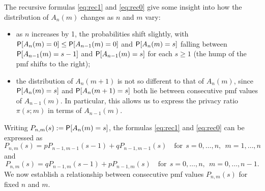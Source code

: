 \documentclass[11pt,draft]{article}
\begin{document}
The recursive formulas \eqref{eq:rec1} and \eqref{eq:rec0} give some insight into how the distribution of $A_n(m)$ changes as $n$ and $m$ vary:
\begin{itemize}
\item  as $n$ increases by 1, the probabilities shift slightly, with $\P[A_n(m) = 0] \leq \P[A_{n-1}(m) = 0]$ and
$\P[A_n(m) = s]$ falling between $\P[A_{n-1}(m) = s-1]$ and $\P[A_{n-1}(m) = s]$ for each $s\geq 1$ (\ie the hump of the pmf shifts to the right);
\item the distribution of $A_n(m+1)$ is not so different to that of $A_n(m)$, since $\P[A_n(m) = s]$ and $\P[A_n(m+1) = s]$ both lie between consecutive pmf values of $A_{n-1}(m)$. In particular, this allows us to express the privacy ratio $\pi(s;m)$ in terms of $A_{n-1}(m)$.
\end{itemize}

Writing $P_{n,m}(s) := \P[A_n(m) = s]$, the formulas \eqref{eq:rec1} and \eqref{eq:rec0} can be expressed as
\[ P_{n,m}(s) = pP_{n-1,m-1}(s-1) + qP_{n-1,m-1}(s)
\quad\text{for}\ \ s = 0,\dots,n,\ \ m = 1,\dots,n \]
and
\[ P_{n,m}(s) = qP_{n-1,m}(s-1) + pP_{n-1,m}(s)
\quad\text{for}\ \ s = 0,\dots,n,\ \ m = 0,\dots,n-1. \]
We now establish a relationship between consecutive pmf values $P_{n,m}(s)$ for fixed $n$ and $m$.
\end{document}

